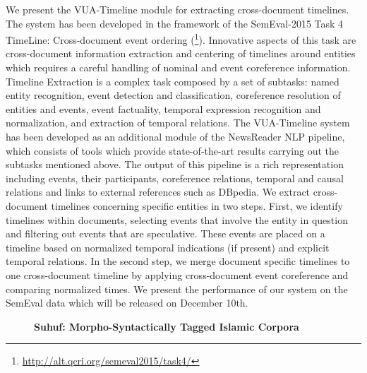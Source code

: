 \documentclass[10pt, a4paper, twopage, headinclude, footinclude, BCOR5mm]{scrartcl}
\begin{document}
\noindent
We present the VUA-Timeline module for extracting cross-document timelines. The system has been developed in the framework of the SemEval-2015 Task 4 TimeLine: Cross-document event ordering (\footnote{\url{http://alt.qcri.org/semeval2015/task4/}}). Innovative aspects of this task are cross-document information extraction and centering of timelines around entities which requires a careful handling of nominal and event coreference information.  Timeline Extraction is a complex task composed by a set of subtasks: named entity recognition, event detection and classification, coreference resolution of entities and events, event factuality, temporal expression recognition and normalization, and extraction of temporal relations. The VUA-Timeline system has been developed as an additional module of the NewsReader NLP pipeline, which consists of tools which provide state-of-the-art results carrying out the subtasks mentioned above. The output of this pipeline is a rich representation including events, their participants, coreference relations, temporal and causal relations and links to external references such as DBpedia. We extract cross-document timelines concerning specific entities in two steps. First, we identify timelines within documents, selecting events that involve the entity in question and filtering out events that are speculative. These events are placed on a timeline based on normalized temporal indications (if present) and explicit temporal relations. In the second step, we merge document specific timelines to one cross-document timeline by applying cross-document event coreference and comparing normalized times. We present the performance of our system on the SemEval data which will be released on December 10th.


\newpage

\begin{figure}[t!]
\centering
\large\textbf{Suhuf: Morpho-Syntactically Tagged Islamic Corpora}
\vspace*{0.5cm}
\end{figure}


        \begin{table}[t!]
    \end{table}
\end{document}
